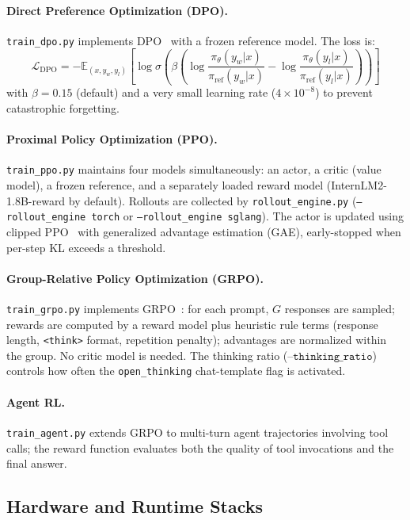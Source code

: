 \paragraph{Direct Preference Optimization (DPO).}
\texttt{train\_dpo.py} implements DPO~\citep{rafailov2023direct} with a frozen
reference model.  The loss is:
\[
  \mathcal{L}_{\text{DPO}} = -\mathbb{E}_{(x, y_w, y_l)} \left[
    \log \sigma \!\left( \beta \left(
      \log \frac{\pi_\theta(y_w|x)}{\pi_{\text{ref}}(y_w|x)} -
      \log \frac{\pi_\theta(y_l|x)}{\pi_{\text{ref}}(y_l|x)}
    \right) \right)
  \right]
\]
with $\beta = 0.15$ (default) and a very small learning rate ($4 \times 10^{-8}$)
to prevent catastrophic forgetting.

\paragraph{Proximal Policy Optimization (PPO).}
\texttt{train\_ppo.py} maintains four models simultaneously: an actor, a critic
(value model), a frozen reference, and a separately loaded reward model
(InternLM2-1.8B-reward by default).  Rollouts are collected by
\texttt{rollout\_engine.py} (\texttt{--rollout\_engine torch} or
\texttt{--rollout\_engine sglang}).  The actor is updated using clipped
PPO~\citep{schulman2017proximal} with generalized advantage estimation (GAE),
early-stopped when per-step KL exceeds a threshold.

\paragraph{Group-Relative Policy Optimization (GRPO).}
\texttt{train\_grpo.py} implements GRPO~\citep{shao2024deepseekmath}: for each
prompt, $G$ responses are sampled; rewards are computed by a reward model plus
heuristic rule terms (response length, \texttt{<think>} format, repetition
penalty); advantages are normalized within the group.  No critic model is needed.
The thinking ratio ($\texttt{--thinking\_ratio}$) controls how often the
\texttt{open\_thinking} chat-template flag is activated.

\paragraph{Agent RL.}
\texttt{train\_agent.py} extends GRPO to multi-turn agent trajectories involving
tool calls; the reward function evaluates both the quality of tool invocations and
the final answer.

\subsection{Hardware and Runtime Stacks}
\label{sec:background:hardware}

